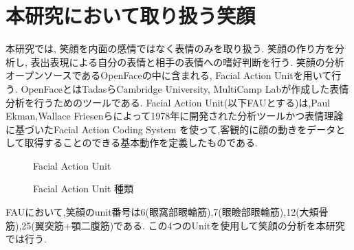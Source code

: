 \section{本研究において取り扱う笑顔}
本研究では, 笑顔を内面の感情ではなく表情のみを取り扱う. %
笑顔の作り方を分析し, 表出表現による自分の表情と相手の表情への嗜好判断を行う.
笑顔の分析オープンソースであるOpenFaceの中に含まれる, Facial Action Unitを用いて行う.
OpenFaceとはTadasらCambridge University, MultiCamp Labが作成した表情分析を行うためのツールである.
Facial Action Unit(以下FAUとする)は,Paul Ekman,Wallace Friesenらによって1978年に開発された分析ツールかつ表情理論に基づいたFacial Action Coding System
を使って,客観的に顔の動きをデータとして取得することのできる基本動作を定義したものである.
\begin{figure}[htbp]
    \begin{center}
    \end{center}
    \caption{Facial Action Unit}
    \label{fig:faus}
    \end{figure}

    \begin{figure}[htbp]
        \begin{center}
        \end{center}
        \caption{Facial Action Unit 種類}
        \label{fig:faus2}
        \end{figure}
  FAUにおいて,笑顔のunit番号は6(眼窩部眼輪筋),7(眼瞼部眼輪筋),12(大頬骨筋),25(翼突筋+顎二腹筋)である.
  この4つのUnitを使用して笑顔の分析を本研究では行う.
